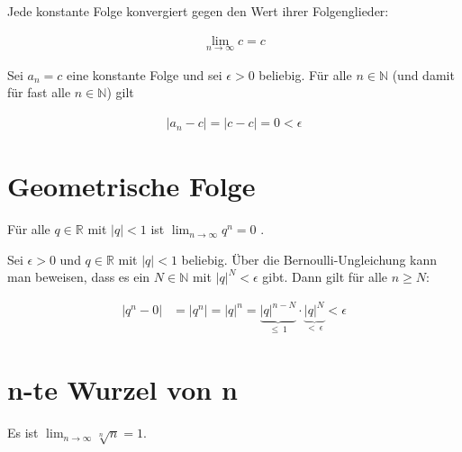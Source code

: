 \documentclass[fontsize=9pt,
               parskip=half-,
               DIV=14,
               listof=chapterentry,
               tocflat]{scrbook}
\begin{document}
\begin{theorem*}
Jede konstante Folge konvergiert gegen den Wert ihrer Folgenglieder:

\begin{align*}
\lim _{n\rightarrow \infty }c=c
\end{align*}

\end{theorem*}

\begin{proof*}
Sei $a_{n}=c$ eine konstante Folge und sei $\epsilon >0$ beliebig. Für alle $n\in \mathbb {N} $ (und damit für fast alle $n\in \mathbb {N} $) gilt

\begin{align*}
|a_{n}-c|=|c-c|=0<\epsilon 
\end{align*}

\end{proof*}

\section{Geometrische Folge}

\begin{theorem*}
Für alle $q\in \mathbb {R} $ mit $|q|<1$ ist $\lim _{n\rightarrow \infty }q^{n}=0$ .

\end{theorem*}

\begin{proof*}
Sei $\epsilon >0$ und $q\in \mathbb {R} $ mit $|q|<1$ beliebig. Über die Bernoulli-Ungleichung kann man beweisen, dass es ein $N\in \mathbb {N} $ mit $|q|^{N}<\epsilon $ gibt. Dann gilt für alle $n\geq N$:

\begin{align*}
\left|q^{n}-0\right|&=\left|q^{n}\right|=|q|^{n}=\underbrace {|q|^{n-N}} _{\leq \ 1}\cdot \underbrace {|q|^{N}} _{<\ \epsilon }<\epsilon 
\end{align*}

\end{proof*}

\section{n-te Wurzel von n}

\begin{theorem*}
Es ist $\lim _{n\rightarrow \infty }{\sqrt[{n}]{n}}=1$.

\end{theorem*}
\end{document}
